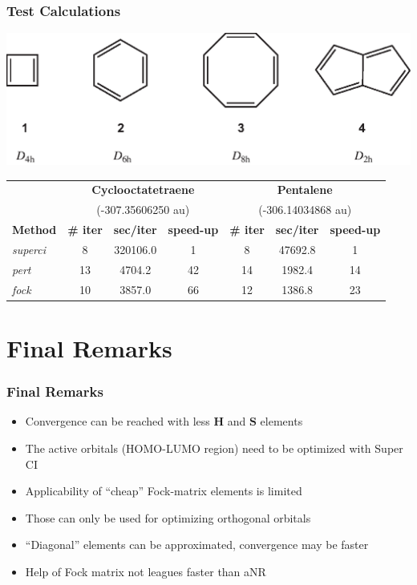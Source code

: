 \documentclass[]{beamer}
\begin{document}
\begin{frame}
  \frametitle{Test Calculations}
  \begin{center}
    \includegraphics[scale=0.45]{figures/compounds.eps}
  \end{center}
  \begin{table}\small
    \begin{center}
      \begin{tabular}{l c c c c c c}
        \hline
        &\multicolumn{3}{c}{\textbf{Cyclooctatetraene}}&\multicolumn{3}{c}{\textbf{Pentalene}}\\
        &\multicolumn{3}{c}{(-307.35606250 au)}&\multicolumn{3}{c}{(-306.14034868 au)}\\
        \textbf{Method}&\textbf{\# iter}&\textbf{sec/iter}&\textbf{speed-up}&\textbf{\# iter}&\textbf{sec/iter}&\textbf{speed-up}\\
        \hline
        \textit{superci}&8&320106.0&1&8&47692.8&1\\
        \textit{pert}&13&4704.2&42&14&1982.4&14\\
        \textit{fock}&10&3857.0&66&12&1386.8&23\\
      \end{tabular}
    \end{center}
  \end{table}
\end{frame}

\section{Final Remarks}

\begin{frame}
  \frametitle{Final Remarks}
  \begin{itemize}
  \item \alert<+> {Convergence can be reached with less $\mathbf{H}$ and $\mathbf{S}$ elements}
  \item \alert<+> {The active orbitals (HOMO-LUMO region) need to be optimized with Super CI}
  \item \alert<+> {Applicability of ``cheap'' Fock-matrix elements is limited}
  \item \alert<+> {Those can only be used for optimizing orthogonal orbitals}
  \item \alert<+> {``Diagonal'' elements can be approximated, convergence may be faster}
  \item \alert<+> {Help of Fock matrix not leagues faster than aNR}
  \end{itemize}
\end{frame}
\end{document}
